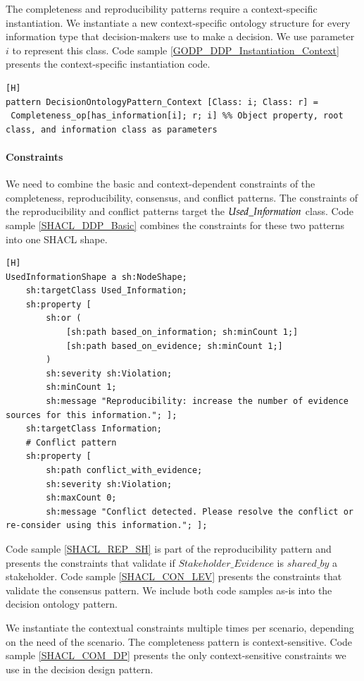 The completeness and reproducibility patterns require a context-specific instantiation. We instantiate a new context-specific ontology structure for every information type that decision-makers use to make a decision. We use parameter $i$ to represent this class. Code sample \ref{GODP_DDP_Instantiation_Context} presents the context-specific instantiation code. 

\begin{lstlisting}[float,language=GDOL,caption={The context-specific GDOL instantiation code to instantiate the decision design pattern. The code is a combination of the context-specific instantiation code of the completeness and reproducibility patterns.},label={GODP_DDP_Instantiation_Context}][H]
pattern DecisionOntologyPattern_Context [Class: i; Class: r] = 
 Completeness_op[has_information[i]; r; i] %% Object property, root class, and information class as parameters
\end{lstlisting}

\paragraph{Constraints}
We need to combine the basic and context-dependent constraints of the completeness, reproducibility, consensus, and conflict patterns. The constraints of the reproducibility and conflict patterns target the $Used\_In{\mkern-2mu f\mkern-3mu}ormation$ class. Code sample \ref{SHACL_DDP_Basic} combines the constraints for these two patterns into one SHACL shape. 

\begin{lstlisting}[float,language=SHACL,caption={This code sample combines the constraints of the reproducibility, consensus, and conflict patterns. We have merged parts of the reproducibility and consensus patterns.},label={SHACL_DDP_Basic}][H]
UsedInformationShape a sh:NodeShape;
	sh:targetClass Used_Information; 
	sh:property [
		sh:or (
			[sh:path based_on_information; sh:minCount 1;]
			[sh:path based_on_evidence; sh:minCount 1;]
		)
		sh:severity sh:Violation; 
		sh:minCount 1; 
		sh:message "Reproducibility: increase the number of evidence sources for this information."; ];
	sh:targetClass Information; 
	# Conflict pattern
	sh:property [
		sh:path conflict_with_evidence; 
		sh:severity sh:Violation; 
		sh:maxCount 0; 
		sh:message "Conflict detected. Please resolve the conflict or re-consider using this information."; ];
\end{lstlisting}

Code sample \ref{SHACL_REP_SH} is part of the reproducibility pattern and presents the constraints that validate if $Stakeholder\_Evidence$ is $shared\_by$ a stakeholder. Code sample \ref{SHACL_CON_LEV} presents the constraints that validate the consensus pattern. We include both code samples as-is into the decision ontology pattern.

We instantiate the contextual constraints multiple times per scenario, depending on the need of the scenario. The completeness pattern is context-sensitive. Code sample \ref{SHACL_COM_DP} presents the only context-sensitive constraints we use in the decision design pattern.